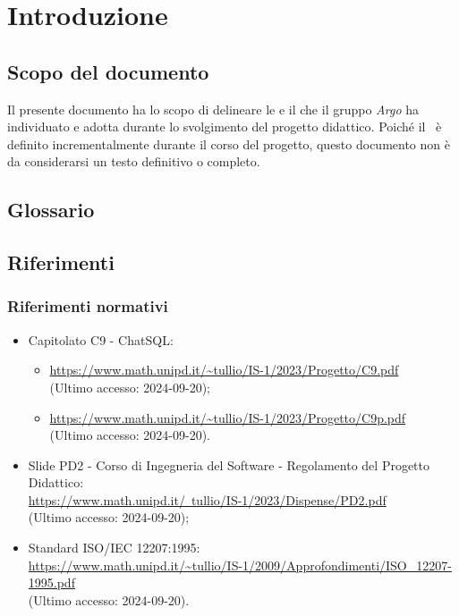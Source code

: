 \section{Introduzione}

\subsection{Scopo del documento}
\par Il presente documento ha lo scopo di delineare le  e il  che il gruppo \textit{Argo} ha individuato e adotta durante lo svolgimento del progetto didattico. Poiché il \WoW\ è definito incrementalmente durante il corso del progetto, questo documento non è da considerarsi un testo definitivo o completo.

\subsection{Glossario}
\GlossarioIntroduzione

\subsection{Riferimenti}

\subsubsection{Riferimenti normativi}
\begin{itemize}
  \item Capitolato C9 - ChatSQL:
  \begin{itemize}
    \item \href{https://www.math.unipd.it/~tullio/IS-1/2023/Progetto/C9.pdf}{https://www.math.unipd.it/\textasciitilde tullio/IS-1/2023/Progetto/C9.pdf} \\ (Ultimo accesso: 2024-09-20);
    \item \href{https://www.math.unipd.it/~tullio/IS-1/2023/Progetto/C9p.pdf}{https://www.math.unipd.it/\textasciitilde tullio/IS-1/2023/Progetto/C9p.pdf} \\ (Ultimo accesso: 2024-09-20).
  \end{itemize}
  \item Slide PD2 - Corso di Ingegneria del Software - Regolamento del Progetto Didattico: \\ \href{https://www.math.unipd.it/~tullio/IS-1/2023/Dispense/PD2.pdf}{https://www.math.unipd.it/~tullio/IS-1/2023/Dispense/PD2.pdf} \\ (Ultimo accesso: 2024-09-20);
  \item Standard ISO/IEC 12207:1995:\\ \url{https://www.math.unipd.it/~tullio/IS-1/2009/Approfondimenti/ISO_12207-1995.pdf} \\ (Ultimo accesso: 2024-09-20).
\end{itemize}

